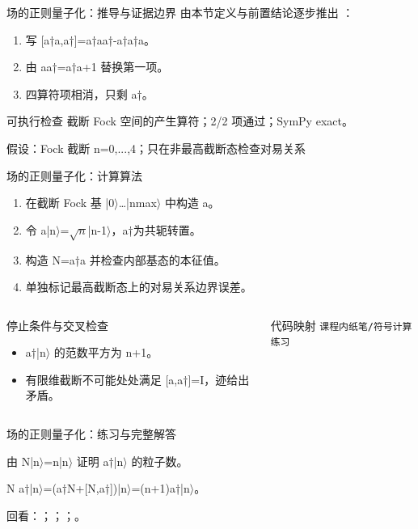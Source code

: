 \begin{frame}[t]{场的正则量子化：推导与证据边界}
\footnotesize
{}\quad 由本节定义与前置结论逐步推出 ：
\begin{enumerate}
\item 写 [a†a,a†]=a†aa†-a†a†a。
\item 由 aa†=a†a+1 替换第一项。
\item 四算符项相消，只剩 a†。
\end{enumerate}\begin{block}{可执行检查}
\quad 截断 Fock 空间的产生算符；2/2 项通过；SymPy exact。
\par\scriptsize 假设：Fock 截断 n=0,...,4；只在非最高截断态检查对易关系
\end{block}
\end{frame}

\begin{frame}[t]{场的正则量子化：计算算法}
\footnotesize
{}\begin{enumerate}
\item 在截断 Fock 基 |0\ensuremath{\rangle}…|nmax\ensuremath{\rangle} 中构造 a。
\item 令 a|n\ensuremath{\rangle}=\ensuremath{\sqrt{n}}|n-1\ensuremath{\rangle}，a†为共轭转置。
\item 构造 N=a†a 并检查内部基态的本征值。
\item 单独标记最高截断态上的对易关系边界误差。
\end{enumerate}\begin{columns}[T,onlytextwidth]
\begin{block}{停止条件与交叉检查}\scriptsize\begin{itemize}
\item[\CheckMark] a†|n\ensuremath{\rangle} 的范数平方为 n+1。
\item[\CheckMark] 有限维截断不可能处处满足 [a,a†]=I，迹给出矛盾。
\end{itemize}\end{block}
\begin{block}{代码映射}
\scriptsize \texttt{课程内纸笔/\allowbreak{}符号计算练习}
\end{block}\end{columns}\end{frame}

\begin{frame}[t]{场的正则量子化：练习与完整解答}
\footnotesize
\begin{block}{}由 N|n\ensuremath{\rangle}=n|n\ensuremath{\rangle} 证明 a†|n\ensuremath{\rangle} 的粒子数。\end{block}
\begin{exampleblock}{}N a†|n\ensuremath{\rangle}=(a†N+[N,a†])|n\ensuremath{\rangle}=(n+1)a†|n\ensuremath{\rangle}。\end{exampleblock}
\vfill
\scriptsize 回看：；；；。
\end{frame}

